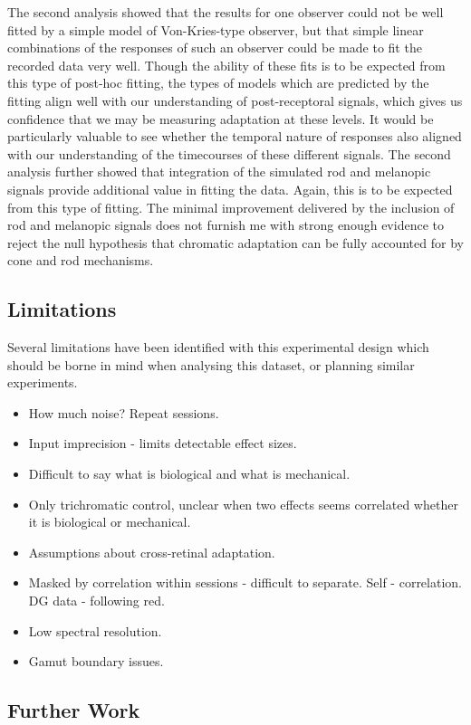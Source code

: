 The second analysis showed that the results for one observer could not be well fitted by a simple model of Von-Kries-type observer, but that simple linear combinations of the responses of such an observer could be made to fit the recorded data very well. Though the ability of these fits is to be expected from this type of post-hoc fitting, the types of models which are predicted by the fitting align well with our understanding of post-receptoral signals, which gives us confidence that we may be measuring adaptation at these levels. It would be particularly valuable to see whether the temporal nature of responses also aligned with our understanding of the timecourses of these different signals. 
The second analysis further showed that integration of the simulated rod and melanopic signals provide additional value in fitting the data. Again, this is to be expected from this type of fitting. The minimal improvement delivered by the inclusion of rod and melanopic signals does not furnish me with strong enough evidence to reject the null hypothesis that chromatic adaptation can be fully accounted for by cone and rod mechanisms. 


\subsection{Limitations}

Several limitations have been identified with this experimental design which should be borne in mind when analysing this dataset, or planning similar experiments.

\begin{itemize}
\item How much noise? Repeat sessions.
\item Input imprecision - limits detectable effect sizes.
\item Difficult to say what is biological and what is mechanical.
\item Only trichromatic control, unclear when two effects seems correlated whether it is biological or mechanical.
\item Assumptions about cross-retinal adaptation.
\item Masked by correlation within sessions - difficult to separate. Self - correlation. DG data - following red.
\item Low spectral resolution.
\item Gamut boundary issues.
\end{itemize}


\subsection{Further Work}


